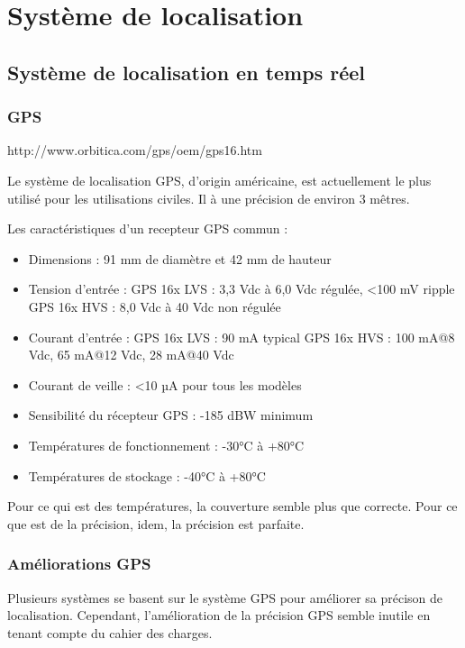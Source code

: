 \section{Système de localisation}

    \subsection{Système de localisation en temps réel}
        \subsubsection{GPS}
	        http://www.orbitica.com/gps/oem/gps16.htm

            Le système de localisation GPS, d'origin américaine, est actuellement le plus utilisé pour les utilisations civiles.
            Il à une précision de environ 3 mêtres.
            
            Les caractéristiques d'un recepteur GPS commun :
            \begin{itemize}
	            \item Dimensions : 91 mm de diamètre et 42 mm de hauteur

	            \item Tension d'entrée :
	                \subitem GPS 16x LVS : 3,3 Vdc à 6,0 Vdc régulée, <100 mV ripple
	                \subitem GPS 16x HVS : 8,0 Vdc à 40 Vdc non régulée
	            \item Courant d'entrée :
	                \subitem GPS 16x LVS : 90 mA typical
	                \subitem GPS 16x HVS : 100 mA@8 Vdc, 65 mA@12 Vdc, 28 mA@40 Vdc
	            \item Courant de veille : <10 µA pour tous les modèles
	            \item Sensibilité du récepteur GPS : -185 dBW minimum

	            \item Températures de fonctionnement : -30°C à +80°C
	            \item Températures de stockage : -40°C à +80°C
            \end{itemize}

	        Pour ce qui est des températures, la couverture semble plus que correcte.
	        Pour ce que est de la précision, idem, la précision est parfaite.
	        
	    \subsubsection{Améliorations GPS}
	        Plusieurs systèmes se basent sur le système GPS pour améliorer sa précison de localisation.
	        Cependant, l'amélioration de la précision GPS semble inutile en tenant compte du cahier des charges.

